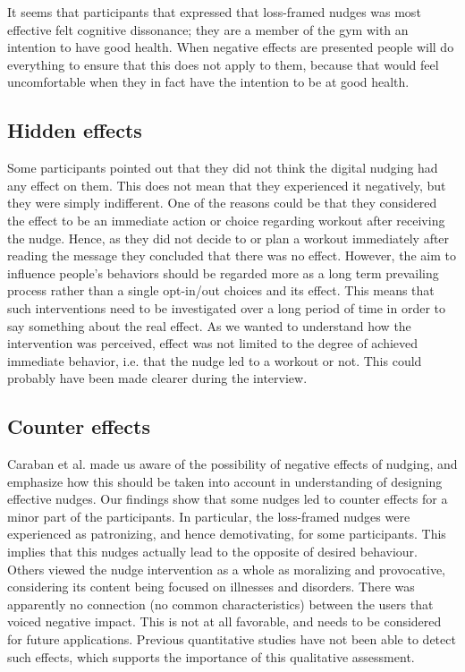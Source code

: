 It seems that participants that expressed that loss-framed nudges was most effective felt cognitive dissonance; they are a member of the gym with an intention to have good health. When negative effects are presented people will do everything to ensure that this does not apply to them, because that would feel uncomfortable when they in fact have the intention to be at good health. 

\subsection{Hidden effects}
Some participants pointed out that they did not think the digital nudging had any effect on them. This does not mean that they experienced it negatively, but they were simply indifferent. One of the reasons could be that they considered the effect to be an immediate action or choice regarding workout after receiving the nudge. Hence, as they did not decide to or plan a workout immediately after reading the message they concluded that there was no effect. However, the aim to influence people's behaviors should be regarded more as a long term prevailing process rather than a single opt-in/out choices and its effect. This means that such interventions need to be investigated over a long period of time in order to say something about the real effect. As we wanted to understand how the intervention was perceived, effect was not limited to the degree of achieved immediate behavior, i.e. that the nudge led to a workout or not. This could probably have been made clearer during the interview.

\subsection{Counter effects}
Caraban et al. \cite{caraban_23_2019} made us aware of the possibility of negative effects of nudging, and emphasize how this should be taken into account in understanding of designing effective nudges. Our findings show that some nudges led to counter effects for a minor part of the participants. In particular, the loss-framed nudges were experienced as patronizing, and hence demotivating, for some participants. This implies that this nudges actually lead to the opposite of desired behaviour. Others viewed the nudge intervention as a whole as moralizing and provocative, considering its content being focused on illnesses and disorders. There was apparently no connection (no common characteristics) between the users that voiced negative impact. This is not at all favorable, and needs to be considered for future applications. Previous quantitative studies have not been able to detect such effects, which supports the importance of this qualitative assessment.   

